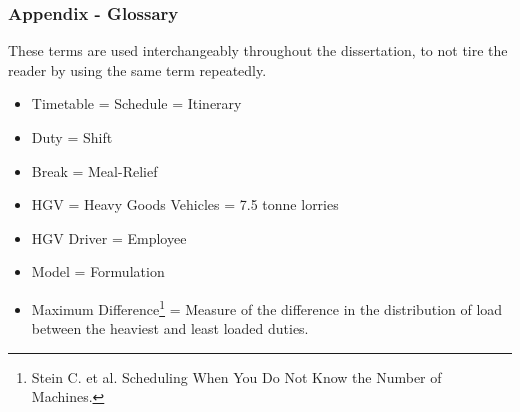 \documentclass[handout]{beamer}
\begin{document}
\begin{frame}
	\frametitle{Appendix - Glossary}

These terms are used interchangeably throughout the dissertation, to not tire the reader by using the same term repeatedly.

\begin{itemize}
\small
    \item Timetable = Schedule = Itinerary
    \item Duty = Shift 
    \item Break = Meal-Relief
    \item HGV = Heavy Goods Vehicles = 7.5 tonne lorries
    \item HGV Driver = Employee
    \item Model = Formulation 
    \item Maximum Difference\footnote{Stein C. et al. Scheduling When You Do Not Know the Number of Machines.} = Measure of the difference in the distribution of load between the heaviest and least loaded duties.
\end{itemize}

    
\end{frame}
 
\end{document}
